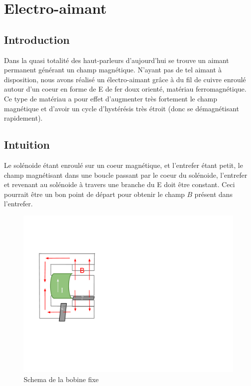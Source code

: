 \chapter{Electro-aimant}
\section{Introduction}
Dans la quasi totalité des haut-parleurs d'aujourd'hui se trouve un aimant permanent générant un champ magnétique.
N'ayant pas de tel aimant à disposition, nous avons réalisé un électro-aimant grâce à du fil de cuivre enroulé autour 
d'un coeur en forme de E de fer doux orienté, matériau ferromagnétique. Ce type de matériau a pour effet d'augmenter très fortement le champ magnétique et d'avoir un cycle d'hystérésis très étroit (donc se démagnétisant rapidement).
\section{Intuition}
Le solénoide étant enroulé sur un coeur magnétique, et l'entrefer étant petit, le champ magnétisant dans 
une boucle passant par le coeur du solénoide, l'entrefer et revenant au solénoide à travers une branche 
du E doit être constant. Ceci pourrait être un bon point de départ pour obtenir le champ $B$ présent dans l'entrefer.

\begin{figure}	
\begin{center}
\includegraphics[scale=0.7]{img/schema-aimant-bobine}
\end{center}
\caption{Schema de la bobine fixe}		
\label{fig:bobinefixe}		
\end{figure}

